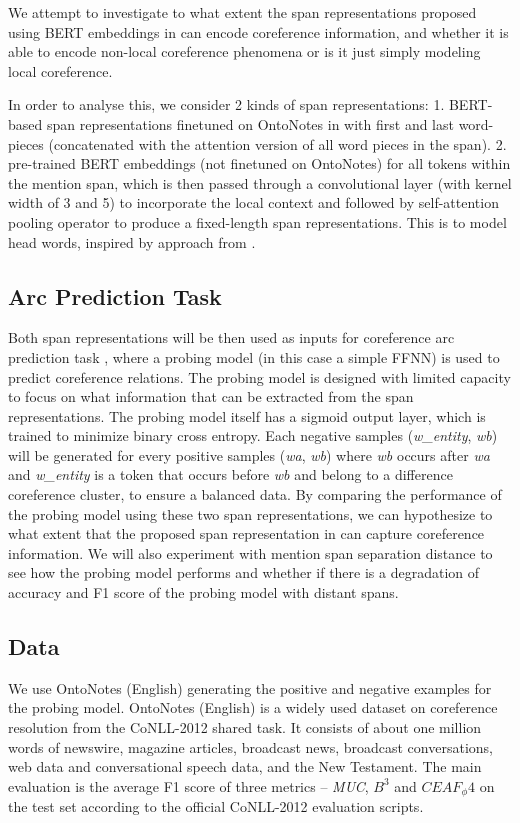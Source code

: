 \documentclass[11pt]{article}
\begin{document}
We attempt to investigate to what extent the span representations proposed using BERT \parencite{devlin2019bert} embeddings in \textcite{joshi2019coref} can encode coreference information, and whether it is able to encode non-local coreference phenomena or is it just simply modeling local coreference.

In order to analyse this, we consider 2 kinds of span representations:
1. BERT-based span representations finetuned on OntoNotes in \textcite{joshi2019coref} with first and last word-pieces (concatenated with the attention version of all word pieces in the span).
2. pre-trained BERT embeddings (not finetuned on OntoNotes) for all tokens within the mention span, which is then passed through a convolutional layer (with kernel width of 3 and 5) to incorporate the local context and followed by self-attention pooling operator to produce a fixed-length span representations. This is to model head words, inspired by approach from \textcite{tenney2019context}.

\subsection{Arc Prediction Task}

Both span representations will be then used as inputs for coreference arc prediction task \cite{liu2019linguistic}, where a probing model (in this case a simple FFNN) is used to predict coreference relations. The probing model is designed with limited capacity to focus on what information that can be extracted from the span representations. The probing model itself has a sigmoid output layer, which is trained to minimize binary cross entropy. Each negative samples (\textit{w\_entity}, \textit{wb}) will be generated for every positive samples (\textit{wa}, \textit{wb}) where \textit{wb} occurs after \textit{wa} and \textit{w\_entity} is a token that occurs before \textit{wb} and belong to a difference coreference cluster, to ensure a balanced data. By comparing the performance of the probing model using these two span representations, we can hypothesize to what extent that the proposed span representation in \textcite{joshi2019coref}  can capture coreference information. We will also experiment with mention span separation distance to see how the probing model performs and whether if there is a degradation of accuracy and F1 score of the probing model with distant spans.

\subsection{Data} 
We use OntoNotes (English) generating the positive and negative examples for the probing model. OntoNotes (English) is a widely used dataset on coreference resolution from the CoNLL-2012 shared task. It consists of about one million words of newswire, magazine articles, broadcast news, broadcast conversations, web data and conversational speech data, and the New Testament. The main evaluation is the average F1 score of three metrics – \textit{MUC}, $B^3$ and $CEAF_ \phi4$ on the test set according to the official CoNLL-2012 evaluation scripts.
\end{document}

